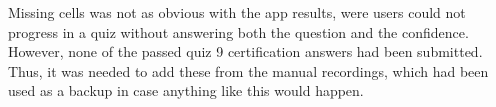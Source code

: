 %
%
%
%

Missing cells was not as obvious with the app results, were users could not progress in a quiz without answering both the question and the confidence. However, none of the passed quiz 9 certification answers had been submitted. Thus, it was needed to add these from the manual recordings, which had been used as a backup in case anything like this would happen.

